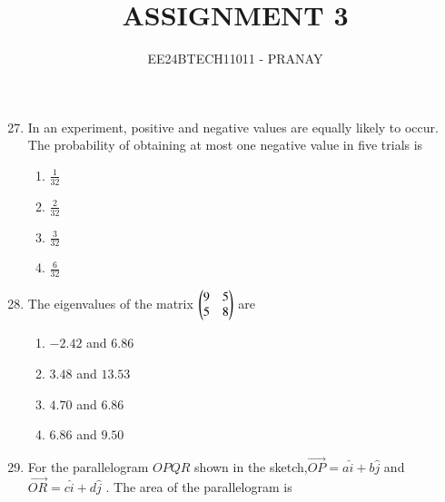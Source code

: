 \documentclass[journal,12pt,onecolumn]{IEEEtran}
\theoremstyle{remark}
\begin{document}

\vspace{3cm}

\title{ASSIGNMENT 3}
\author{EE24BTECH11011 - PRANAY}
\maketitle

\bigskip

\renewcommand{\thefigure}{\theenumi}
\renewcommand{\thetable}{\theenumi}
\begin{enumerate}\setcounter{enumi}{26}
   \item In an experiment, positive and negative values are equally likely to occur. The probability of obtaining at most one negative value in five trials is
   \begin{multicols}{4}
   \begin{enumerate}
       \item $\frac{1}{32}$
       \item $\frac{2}{32}$
       \item $\frac{3}{32}$
       \item $\frac{6}{32}$
   \end{enumerate}
   \end{multicols}
   \item The eigenvalues of the matrix $\begin{pmatrix}9 & 5 \\ 5 & 8\end{pmatrix}$ are
   \begin{multicols}{4}
       \begin{enumerate}
           \item $-2.42$ and $6.86$
           \item $3.48$ and $13.53$
           \item $4.70$ and $6.86$
           \item $6.86$ and $9.50$
       \end{enumerate}
   \end{multicols}
   \item For the parallelogram $OPQR$ shown in the sketch,$\vec{OP} = a\hat{i}+b\hat{j}$ and $\vec{OR} = c\hat{i}+d\hat{j}$ . The area of the parallelogram is
	   \begin{center}


\end{center}
\end{enumerate}
\end{document}
